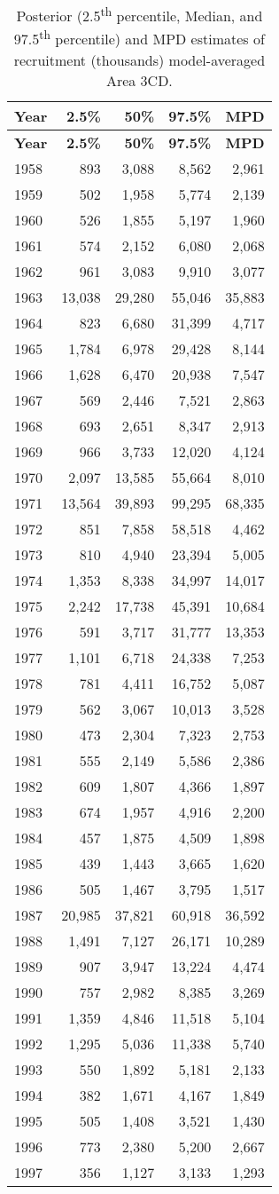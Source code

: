 \documentclass[11pt]{book}
\begin{document}
\begin{longtable}[]{@{}lrrrr@{}}
\caption{\label{tab:tab-post-recr-avg-3cd}Posterior (2.5\textsuperscript{th} percentile, Median, and 97.5\textsuperscript{th} percentile) and MPD estimates of recruitment (thousands) model-averaged Area 3CD.}\tabularnewline
\toprule
\textbf{Year} & \textbf{2.5\%} & \textbf{50\%} & \textbf{97.5\%} & \textbf{MPD}\tabularnewline
\midrule
\endfirsthead
\toprule
\textbf{Year} & \textbf{2.5\%} & \textbf{50\%} & \textbf{97.5\%} & \textbf{MPD}\tabularnewline
\midrule
\endhead
1958 & 893 & 3,088 & 8,562 & 2,961\tabularnewline
1959 & 502 & 1,958 & 5,774 & 2,139\tabularnewline
1960 & 526 & 1,855 & 5,197 & 1,960\tabularnewline
1961 & 574 & 2,152 & 6,080 & 2,068\tabularnewline
1962 & 961 & 3,083 & 9,910 & 3,077\tabularnewline
1963 & 13,038 & 29,280 & 55,046 & 35,883\tabularnewline
1964 & 823 & 6,680 & 31,399 & 4,717\tabularnewline
1965 & 1,784 & 6,978 & 29,428 & 8,144\tabularnewline
1966 & 1,628 & 6,470 & 20,938 & 7,547\tabularnewline
1967 & 569 & 2,446 & 7,521 & 2,863\tabularnewline
1968 & 693 & 2,651 & 8,347 & 2,913\tabularnewline
1969 & 966 & 3,733 & 12,020 & 4,124\tabularnewline
1970 & 2,097 & 13,585 & 55,664 & 8,010\tabularnewline
1971 & 13,564 & 39,893 & 99,295 & 68,335\tabularnewline
1972 & 851 & 7,858 & 58,518 & 4,462\tabularnewline
1973 & 810 & 4,940 & 23,394 & 5,005\tabularnewline
1974 & 1,353 & 8,338 & 34,997 & 14,017\tabularnewline
1975 & 2,242 & 17,738 & 45,391 & 10,684\tabularnewline
1976 & 591 & 3,717 & 31,777 & 13,353\tabularnewline
1977 & 1,101 & 6,718 & 24,338 & 7,253\tabularnewline
1978 & 781 & 4,411 & 16,752 & 5,087\tabularnewline
1979 & 562 & 3,067 & 10,013 & 3,528\tabularnewline
1980 & 473 & 2,304 & 7,323 & 2,753\tabularnewline
1981 & 555 & 2,149 & 5,586 & 2,386\tabularnewline
1982 & 609 & 1,807 & 4,366 & 1,897\tabularnewline
1983 & 674 & 1,957 & 4,916 & 2,200\tabularnewline
1984 & 457 & 1,875 & 4,509 & 1,898\tabularnewline
1985 & 439 & 1,443 & 3,665 & 1,620\tabularnewline
1986 & 505 & 1,467 & 3,795 & 1,517\tabularnewline
1987 & 20,985 & 37,821 & 60,918 & 36,592\tabularnewline
1988 & 1,491 & 7,127 & 26,171 & 10,289\tabularnewline
1989 & 907 & 3,947 & 13,224 & 4,474\tabularnewline
1990 & 757 & 2,982 & 8,385 & 3,269\tabularnewline
1991 & 1,359 & 4,846 & 11,518 & 5,104\tabularnewline
1992 & 1,295 & 5,036 & 11,338 & 5,740\tabularnewline
1993 & 550 & 1,892 & 5,181 & 2,133\tabularnewline
1994 & 382 & 1,671 & 4,167 & 1,849\tabularnewline
1995 & 505 & 1,408 & 3,521 & 1,430\tabularnewline
1996 & 773 & 2,380 & 5,200 & 2,667\tabularnewline
1997 & 356 & 1,127 & 3,133 & 1,293\tabularnewline

\end{longtable}
\end{document}
